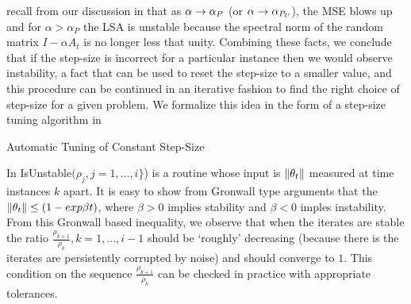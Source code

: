 recall from our discussion in  that as $\alpha\rightarrow\alpha_P$ (or $\alpha\rightarrow\alpha_{P_U}$), the MSE blows up and for $\alpha>\alpha_P$ the LSA is unstable because the spectral norm of the random matrix $I-\alpha A_t$ is no longer less that unity. Combining these facts, we conclude that if the step-size is incorrect for a particular instance then we would observe instability, a fact that can be used to reset the step-size to a smaller value, and this procedure can be continued in an iterative fashion to find the right choice of step-size for a given problem. We formalize this idea in the form of a step-size tuning algorithm in 

\begin{algorithm}[H]
\caption*{Automatic Tuning of Constant Step-Size}
\begin{algorithmic}[1]
\ENDIF
{}
\ENDIF
\ENDFOR
\end{algorithmic}
\label{alg:tuning}
\end{algorithm}
In  IsUnstable$(\rho_j,j=1,\ldots,i\}$) is a routine whose input is $\left\| \theta_t\right\|$ measured at time instances $k$ apart. It is easy to show from Gronwall type arguments that the $\left\| \theta_t\right\|\leq (1-exp{\beta t})$, where $\beta>0$ implies stability and $\beta<0$ imples instability. From this Gronwall based inequality, we observe that when the iterates are stable the ratio $\frac{\rho_{k+1}}{\rho_k},k=1,\ldots,i-1$ should be `roughly' decreasing (because there is the iterates are persistently corrupted by noise) and should converge to $1$. This condition on the sequence $\frac{\rho_{k+1}}{\rho_k}$ can be checked in practice with appropriate tolerances.
